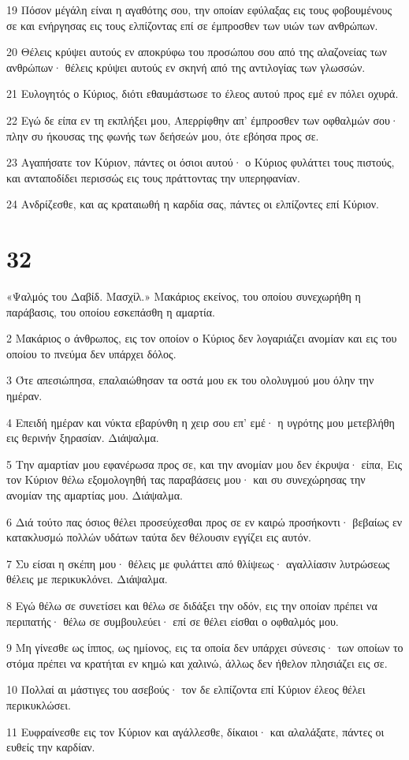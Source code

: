 \par 19 Πόσον μέγάλη είναι η αγαθότης σου, την οποίαν εφύλαξας εις τους φοβουμένους σε και ενήργησας εις τους ελπίζοντας επί σε έμπροσθεν των υιών των ανθρώπων.
\par 20 Θέλεις κρύψει αυτούς εν αποκρύφω του προσώπου σου από της αλαζονείας των ανθρώπων· θέλεις κρύψει αυτούς εν σκηνή από της αντιλογίας των γλωσσών.
\par 21 Ευλογητός ο Κύριος, διότι εθαυμάστωσε το έλεος αυτού προς εμέ εν πόλει οχυρά.
\par 22 Εγώ δε είπα εν τη εκπλήξει μου, Απερρίφθην απ' έμπροσθεν των οφθαλμών σου· πλην συ ήκουσας της φωνής των δεήσεών μου, ότε εβόησα προς σε.
\par 23 Αγαπήσατε τον Κύριον, πάντες οι όσιοι αυτού· ο Κύριος φυλάττει τους πιστούς, και ανταποδίδει περισσώς εις τους πράττοντας την υπερηφανίαν.
\par 24 Ανδρίζεσθε, και ας κραταιωθή η καρδία σας, πάντες οι ελπίζοντες επί Κύριον.

\chapter{32}

\par «Ψαλμός του Δαβίδ. Μασχίλ.» Μακάριος εκείνος, του οποίου συνεχωρήθη η παράβασις, του οποίου εσκεπάσθη η αμαρτία.
\par 2 Μακάριος ο άνθρωπος, εις τον οποίον ο Κύριος δεν λογαριάζει ανομίαν και εις του οποίου το πνεύμα δεν υπάρχει δόλος.
\par 3 Ότε απεσιώπησα, επαλαιώθησαν τα οστά μου εκ του ολολυγμού μου όλην την ημέραν.
\par 4 Επειδή ημέραν και νύκτα εβαρύνθη η χειρ σου επ' εμέ· η υγρότης μου μετεβλήθη εις θερινήν ξηρασίαν. Διάψαλμα.
\par 5 Την αμαρτίαν μου εφανέρωσα προς σε, και την ανομίαν μου δεν έκρυψα· είπα, Εις τον Κύριον θέλω εξομολογηθή τας παραβάσεις μου· και συ συνεχώρησας την ανομίαν της αμαρτίας μου. Διάψαλμα.
\par 6 Διά τούτο πας όσιος θέλει προσεύχεσθαι προς σε εν καιρώ προσήκοντι· βεβαίως εν κατακλυσμώ πολλών υδάτων ταύτα δεν θέλουσιν εγγίζει εις αυτόν.
\par 7 Συ είσαι η σκέπη μου· θέλεις με φυλάττει από θλίψεως· αγαλλίασιν λυτρώσεως θέλεις με περικυκλόνει. Διάψαλμα.
\par 8 Εγώ θέλω σε συνετίσει και θέλω σε διδάξει την οδόν, εις την οποίαν πρέπει να περιπατής· θέλω σε συμβουλεύει· επί σε θέλει είσθαι ο οφθαλμός μου.
\par 9 Μη γίνεσθε ως ίππος, ως ημίονος, εις τα οποία δεν υπάρχει σύνεσις· των οποίων το στόμα πρέπει να κρατήται εν κημώ και χαλινώ, άλλως δεν ήθελον πλησιάζει εις σε.
\par 10 Πολλαί αι μάστιγες του ασεβούς· τον δε ελπίζοντα επί Κύριον έλεος θέλει περικυκλώσει.
\par 11 Ευφραίνεσθε εις τον Κύριον και αγάλλεσθε, δίκαιοι· και αλαλάξατε, πάντες οι ευθείς την καρδίαν.

